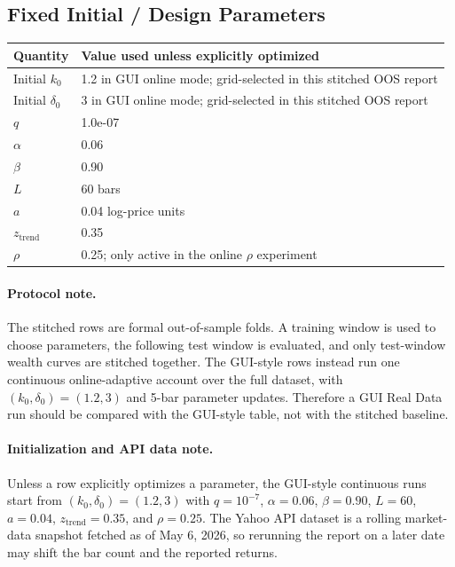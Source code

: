 \documentclass[10pt]{article}
\begin{document}
\subsection*{Fixed Initial / Design Parameters}
\small
\begin{tabular}{ll}
\toprule
Quantity & Value used unless explicitly optimized \\
\midrule
Initial $k_0$ & 1.2 in GUI online mode; grid-selected in this stitched OOS report \\
Initial $\delta_0$ & 3 in GUI online mode; grid-selected in this stitched OOS report \\
$q$ & 1.0e-07 \\
$\alpha$ & 0.06 \\
$\beta$ & 0.90 \\
$L$ & 60 bars \\
$a$ & 0.04 log-price units \\
$z_{\mathrm{trend}}$ & 0.35 \\
$\rho$ & 0.25; only active in the online $\rho$ experiment \\
\bottomrule
\end{tabular}
\normalsize

\paragraph{Protocol note.}
The stitched rows are formal out-of-sample folds. A training window is used to
choose parameters, the following test window is evaluated, and only test-window
wealth curves are stitched together. The GUI-style rows instead run one
continuous online-adaptive account over the full dataset, with
$(k_0,\delta_0)=(1.2,3)$ and 5-bar parameter updates. Therefore a GUI Real Data
run should be compared with the GUI-style table, not with the stitched baseline.

\paragraph{Initialization and API data note.}
Unless a row explicitly optimizes a parameter, the GUI-style continuous runs
start from $(k_0,\delta_0)=(1.2,3)$ with
$q=10^{-7}$, $\alpha=0.06$, $\beta=0.90$, $L=60$, $a=0.04$,
$z_{\mathrm{trend}}=0.35$, and $\rho=0.25$. The Yahoo API dataset is a rolling
market-data snapshot fetched as of May 6, 2026, so rerunning the report on a
later date may shift the bar count and the reported returns.
\end{document}

